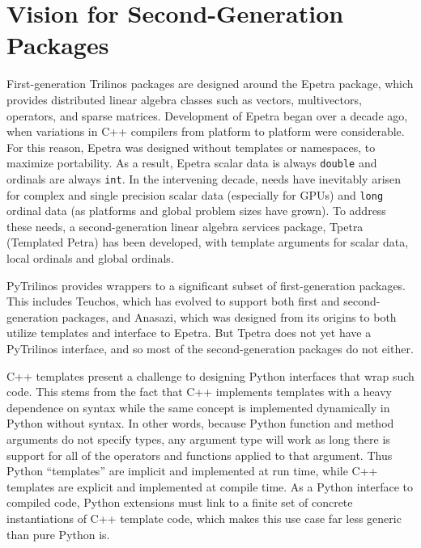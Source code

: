 \documentclass[11pt]{article}
\begin{document}
\section{Vision for Second-Generation Packages}
\label{sec:vision}

First-generation Trilinos packages are designed around the Epetra package, which provides distributed linear algebra classes such as vectors, multivectors, operators, and sparse matrices.  Development of Epetra began over a decade ago, when variations in C++ compilers from platform to platform were considerable.  For this reason, Epetra was designed without templates or namespaces, to maximize portability.  As a result, Epetra scalar data is always {\tt double} and ordinals are always {\tt int}.  In the intervening decade, needs have inevitably arisen for complex and single precision scalar data (especially for GPUs) and {\tt long} ordinal data (as platforms and global problem sizes have grown).  To address these needs, a second-generation linear algebra services package, Tpetra (Templated Petra) has been developed, with template arguments for scalar data, local ordinals and global ordinals.

PyTrilinos provides wrappers to a significant subset of first-generation packages.  This includes Teuchos, which has evolved to support both first and second-generation packages, and Anasazi, which was designed from its origins to both utilize templates and interface to Epetra.  But Tpetra does not yet have a PyTrilinos interface, and so most of the second-generation packages do not either.

C++ templates present a challenge to designing Python interfaces that wrap such code.  This stems from the fact that C++ implements templates with a heavy dependence on syntax while the same concept is implemented dynamically in Python without syntax.  In other words, because Python function and method arguments do not specify types, any argument type will work as long there is support for all of the operators and functions applied to that argument.  Thus Python ``templates'' are implicit and implemented at run time, while C++ templates are explicit and implemented at compile time.  As a Python interface to compiled code, Python extensions must link to a finite set of concrete instantiations of C++ template code, which makes this use case far less generic than pure Python is.
\end{document}
